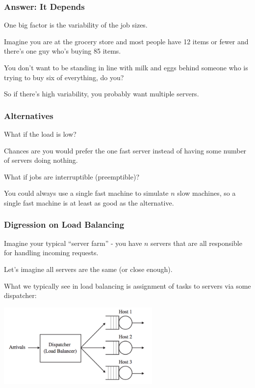 \begin{frame}
\frametitle{Answer: It Depends}

One big factor is the variability of the job sizes. 

Imagine you are at the grocery store and most people have 12 items or fewer and there's one guy who's buying 85 items. 

You don't want to be standing in line with milk and eggs behind someone who is trying to buy six of everything, do you? 

So if there's high variability, you probably want multiple servers.

\end{frame}



\begin{frame}
\frametitle{Alternatives}

What if the load is low? 

Chances are you would prefer the one fast server instead of having some number of servers doing nothing.

What if jobs are interruptible (preemptible)? 

You could always use a single fast machine to simulate $n$ slow machines, so a single fast machine is at least as good as the alternative. 

\end{frame}



\begin{frame}
\frametitle{Digression on Load Balancing}

Imagine your typical ``server farm'' - you have $n$ servers that are all responsible for handling incoming requests. 

Let's imagine all servers are the same (or close enough). 

What we typically see in load balancing is assignment of tasks to servers via some dispatcher:

\begin{center}
	\includegraphics[width=0.6\textwidth]{images/central-dispatcher.png}
\end{center}

\end{frame}



